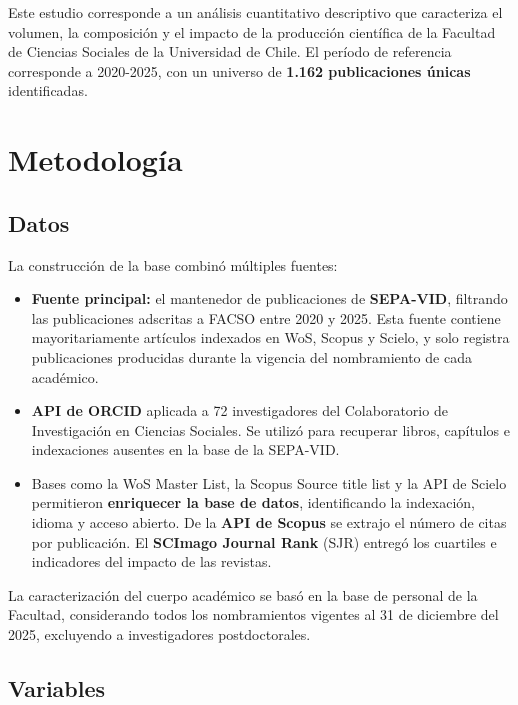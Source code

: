 \documentclass[
  spanish,
  a4paper,
  oneside]{scrbook}
\providecommand{\tightlist}{%
  \setlength{\itemsep}{0pt}\setlength{\parskip}{0pt}}
\begin{document}
Este estudio corresponde a un análisis cuantitativo descriptivo que
caracteriza el volumen, la composición y el impacto de la producción
científica de la Facultad de Ciencias Sociales de la Universidad de
Chile. El período de referencia corresponde a 2020-2025, con un universo
de \textbf{1.162 publicaciones únicas} identificadas.

\section*{Metodología}\label{metodologuxeda}


\subsection*{Datos}\label{datos}

La construcción de la base combinó múltiples fuentes:

\begin{itemize}
\tightlist
\item
  \textbf{Fuente principal:} el mantenedor de publicaciones de
  \textbf{SEPA-VID}, filtrando las publicaciones adscritas a FACSO entre
  2020 y 2025. Esta fuente contiene mayoritariamente artículos indexados
  en WoS, Scopus y Scielo, y solo registra publicaciones producidas
  durante la vigencia del nombramiento de cada académico.
\item
  \textbf{API de ORCID} aplicada a 72 investigadores del Colaboratorio
  de Investigación en Ciencias Sociales. Se utilizó para recuperar
  libros, capítulos e indexaciones ausentes en la base de la SEPA-VID.
\item
  Bases como la WoS Master List, la Scopus Source title list y la API de
  Scielo permitieron \textbf{enriquecer la base de datos}, identificando
  la indexación, idioma y acceso abierto. De la \textbf{API de Scopus}
  se extrajo el número de citas por publicación. El \textbf{SCImago
  Journal Rank} (SJR) entregó los cuartiles e indicadores del impacto de
  las revistas.
\end{itemize}

La caracterización del cuerpo académico se basó en la base de personal
de la Facultad, considerando todos los nombramientos vigentes al 31 de
diciembre del 2025, excluyendo a investigadores postdoctorales.

\subsection*{Variables}\label{variables}
\end{document}
